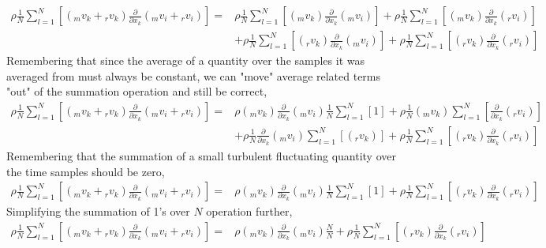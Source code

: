 \begin{align*}
\rho\frac{1}{N}\sum^{N}_{l = 1}\left[({}_{m}v_{k} + {}_{r}v_{k})\frac{\partial }{\partial x_{k}}({}_{m}v_{i} + {}_{r}v_{i})\right] = &
\rho\frac{1}{N}\sum^{N}_{l = 1}\left[({}_{m}v_{k})\frac{\partial }{\partial x_{k}}({}_{m}v_{i})\right] 
+ \rho\frac{1}{N}\sum^{N}_{l = 1}\left[({}_{m}v_{k})\frac{\partial }{\partial x_{k}}({}_{r}v_{i})\right]   
\\ & + \rho\frac{1}{N}\sum^{N}_{l = 1}\left[({}_{r}v_{k})\frac{\partial }{\partial x_{k}}({}_{m}v_{i})\right] 
+ \rho\frac{1}{N}\sum^{N}_{l = 1}\left[({}_{r}v_{k})\frac{\partial }{\partial x_{k}}({}_{r}v_{i})\right] 
\end{align*}
Remembering that since the average of a quantity over the samples it was averaged from must always be constant, we can "move" average related terms "out" of the summation operation and still be correct,
\begin{align*}
\rho\frac{1}{N}\sum^{N}_{l = 1}\left[({}_{m}v_{k} + {}_{r}v_{k})\frac{\partial }{\partial x_{k}}({}_{m}v_{i} + {}_{r}v_{i})\right] = &
\rho({}_{m}v_{k})\frac{\partial }{\partial x_{k}}({}_{m}v_{i})\frac{1}{N}\sum^{N}_{l = 1}\left[1\right] 
+ \rho\frac{1}{N}({}_{m}v_{k})\sum^{N}_{l = 1}\left[\frac{\partial }{\partial x_{k}}({}_{r}v_{i})\right]   
\\ & + \rho\frac{1}{N}\frac{\partial }{\partial x_{k}}({}_{m}v_{i})\sum^{N}_{l = 1}\left[({}_{r}v_{k})\right] 
+ \rho\frac{1}{N}\sum^{N}_{l = 1}\left[({}_{r}v_{k})\frac{\partial }{\partial x_{k}}({}_{r}v_{i})\right] 
\end{align*}
Remembering that the summation of a small turbulent fluctuating quantity over the time samples should be zero,
\begin{align*}
\rho\frac{1}{N}\sum^{N}_{l = 1}\left[({}_{m}v_{k} + {}_{r}v_{k})\frac{\partial }{\partial x_{k}}({}_{m}v_{i} + {}_{r}v_{i})\right] = &
\rho({}_{m}v_{k})\frac{\partial }{\partial x_{k}}({}_{m}v_{i})\frac{1}{N}\sum^{N}_{l = 1}\left[1\right] 
+ \rho\frac{1}{N}\sum^{N}_{l = 1}\left[({}_{r}v_{k})\frac{\partial }{\partial x_{k}}({}_{r}v_{i})\right] 
\end{align*}
Simplifying the summation of 1's over $N$ operation further,
\begin{align*}
\rho\frac{1}{N}\sum^{N}_{l = 1}\left[({}_{m}v_{k} + {}_{r}v_{k})\frac{\partial }{\partial x_{k}}({}_{m}v_{i} + {}_{r}v_{i})\right] = &
\rho({}_{m}v_{k})\frac{\partial }{\partial x_{k}}({}_{m}v_{i})\frac{N}{N}
+ \rho\frac{1}{N}\sum^{N}_{l = 1}\left[({}_{r}v_{k})\frac{\partial }{\partial x_{k}}({}_{r}v_{i})\right] 
\end{align*}
